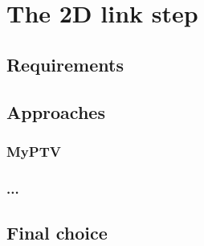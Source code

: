 \chapter{The 2D link step}
\label{chap:2dlink}

\section{Requirements}
\section{Approaches}
\subsection{MyPTV}
\subsection{...}
\section{Final choice}
